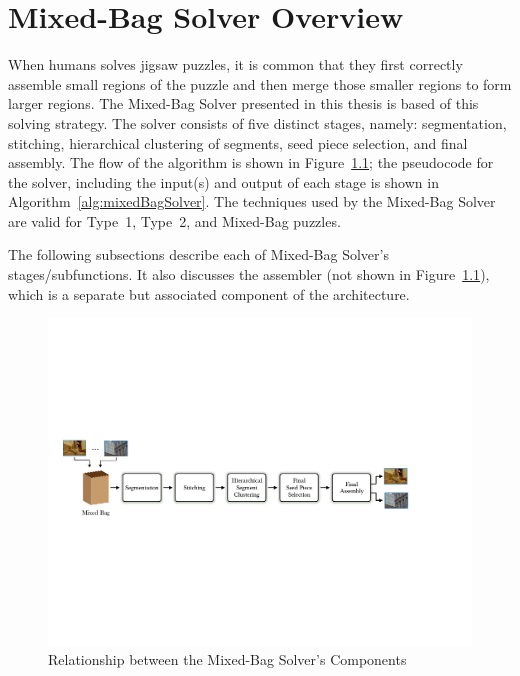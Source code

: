 \chapter{Mixed-Bag Solver Overview}\label{chap:mixedBagSolver}

When humans solves jigsaw puzzles, it is common that they first correctly assemble small regions of the puzzle and then merge those smaller regions to form larger regions.  The Mixed-Bag Solver presented in this thesis is based of this solving strategy.  The solver consists of five distinct stages, namely: segmentation, stitching, hierarchical clustering of segments, seed piece selection, and final assembly.  The flow of the algorithm is shown in Figure~\ref{fig:multipuzzleSolverArchitecture}; the pseudocode for the solver, including the input(s) and output of each stage is shown in Algorithm~\ref{alg:mixedBagSolver}.  The techniques used by the Mixed-Bag Solver are valid for Type~1, Type~2, and Mixed-Bag puzzles.  

The following subsections describe each of Mixed-Bag Solver's stages/subfunctions.  It also discusses the assembler (not shown in Figure~\ref{fig:multipuzzleSolverArchitecture}), which is a separate but associated component of the architecture.

\begin{figure}[ht!]
	\centering
		\includegraphics[width=1.0\textwidth]{images/cropped_algorithm_structure_overview.pdf}
	\caption{Relationship between the Mixed-Bag Solver's Components}\label{fig:multipuzzleSolverArchitecture}
\end{figure}

